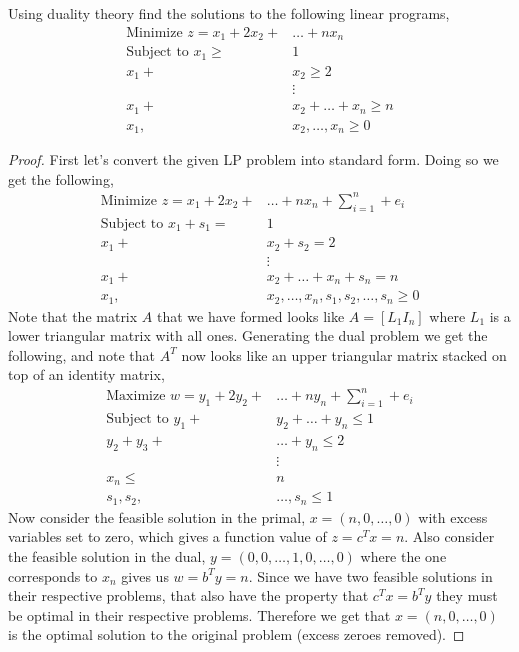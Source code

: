 \documentclass[12pt]{article}
\makeatletter
\theoremstyle{homework}
\newenvironment{exercise}[1]
{\def\@currentlabel{#1}\exercisecore}
{\endexercisecore}
\makeatother
\begin{document}
\begin{exercise}{2.8} Using duality theory find the solutions to the following linear programs, 
  \begin{align*}
    \text{Minimize } z = x_1 + 2x_2 + &\dots + nx_n\\
    \text{Subject to } x_1 \geq &1\\
    x_1 + &x_2 \geq 2\\
    &\vdots\\
    x_1 + &x_2 + \dots + x_n \geq n\\
    x_1, &x_2, \dots, x_n \geq 0
  \end{align*}
  \begin{proof} First let's convert the given LP problem into standard form. Doing so we get the following, 
    \begin{align*}
      \text{Minimize } z = x_1 + 2x_2 + &\dots + nx_n + \sum_{i = 1}^n + e_i\\
      \text{Subject to } x_1 + s_1 = &1\\
      x_1 + &x_2 + s_2 = 2\\
      &\vdots\\
      x_1 + &x_2 + \dots + x_n + s_n = n\\
      x_1, &x_2, \dots, x_n, s_1, s_2, \dots, s_n \geq 0
    \end{align*}
    Note that the matrix $A$ that we have formed looks like $A = [L_1 I_n]$ where $L_1$ is a lower triangular matrix with all 
    ones. Generating the dual problem we get the following, and note that $A^T$ now looks like an upper triangular matrix stacked on top of 
    an identity matrix,
    \begin{align*}
      \text{Maximize } w = y_1 + 2y_2 + &\dots + ny_n + \sum_{i = 1}^n + e_i\\
      \text{Subject to } y_1 + &y_2 + \dots + y_n \leq 1\\
      y_2 + y_3 + &\dots + y_n \leq 2\\
      &\vdots\\
      x_n \leq &n\\
      s_1, s_2, &\dots, s_n \leq 1
    \end{align*}
    Now consider the feasible solution in the primal, $x = (n, 0,\dots, 0)$ with excess variables set to zero, which gives a function value of $z = c^Tx = n$. Also consider the 
    feasible solution in the dual, $y = (0, 0, \dots, 1, 0, \dots, 0)$ where the one corresponds to $x_n$ gives us $w = b^Ty = n$. Since we have two feasible solutions in their
    respective problems, that also have the property that $c^Tx = b^Ty$ they must be optimal in their respective problems. Therefore we get that $x = (n, 0,\dots, 0)$ is the optimal solution to 
    the original problem (excess zeroes removed). 
 \end{proof}
\end{exercise}
\vspace{.5in}
\end{document}
